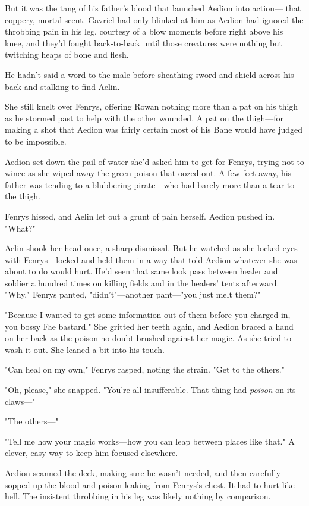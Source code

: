 But it was the tang of his father's blood that launched Aedion into action--- that coppery, mortal scent.
Gavriel had only blinked at him as Aedion had ignored the throbbing pain in his leg, courtesy of a blow moments before right above his knee, and they'd fought back-to-back until those creatures were nothing but twitching heaps of bone and flesh.

He hadn't said a word to the male before sheathing sword and shield across his back and stalking to find Aelin.

She still knelt over Fenrys, offering Rowan nothing more than a pat on his thigh as he stormed past to help with the other wounded.
A pat on the thigh---for making a shot that Aedion was fairly certain most of his Bane would have judged to be impossible.

Aedion set down the pail of water she'd asked him to get for Fenrys, trying not to wince as she wiped away the green poison that oozed out.
A few feet away, his father was tending to a blubbering pirate---who had barely more than a tear to the thigh.

Fenrys hissed, and Aelin let out a grunt of pain herself.
Aedion pushed in.
"What?"

Aelin shook her head once, a sharp dismissal.
But he watched as she locked eyes with Fenrys---locked and held them in a way that told Aedion whatever she was about to do would hurt.
He'd seen that same look pass between healer and soldier a hundred times on killing fields and in the healers' tents afterward.
"Why," Fenrys panted, "didn't"---another pant---"you just melt them?"

"Because I wanted to get some information out of them before you charged in, you bossy Fae bastard."
She gritted her teeth again, and Aedion braced a hand on her back as the poison no doubt brushed against her magic.
As she tried to wash it out.
She leaned a bit into his touch.

"Can heal on my own," Fenrys rasped, noting the strain.
"Get to the others."

"Oh, please," she snapped.
"You're all insufferable.
That thing had \emph{poison} on its claws---"

"The others---"

"Tell me how your magic works---how you can leap between places like that."
A clever, easy way to keep him focused elsewhere.

Aedion scanned the deck, making sure he wasn't needed, and then carefully sopped up the blood and poison leaking from Fenrys's chest.
It had to hurt like hell.
The insistent throbbing in his leg was likely nothing by comparison.

